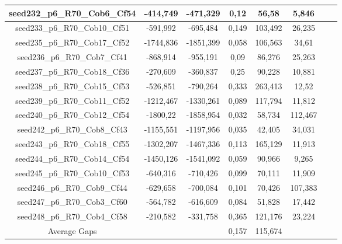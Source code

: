 \documentclass[a4paper]{article}
\begin{document}
\begin{center}
\begin{longtable}{cccccccc}
\hline
seed232\_p6\_R70\_Cob6\_Cf54 & -414,749 & -471,329 & 0,12 & 56,58 & 5,846\\
\hline
seed233\_p6\_R70\_Cob10\_Cf51 & -591,992 & -695,484 & 0,149 & 103,492 & 26,235\\
\hline
seed235\_p6\_R70\_Cob17\_Cf52 & -1744,836 & -1851,399 & 0,058 & 106,563 & 34,61\\
\hline
seed236\_p6\_R70\_Cob7\_Cf41 & -868,914 & -955,191 & 0,09 & 86,276 & 25,263\\
\hline
seed237\_p6\_R70\_Cob18\_Cf36 & -270,609 & -360,837 & 0,25 & 90,228 & 10,881\\
\hline
seed238\_p6\_R70\_Cob15\_Cf53 & -526,851 & -790,264 & 0,333 & 263,413 & 12,52\\
\hline
seed239\_p6\_R70\_Cob11\_Cf52 & -1212,467 & -1330,261 & 0,089 & 117,794 & 11,812\\
\hline
seed240\_p6\_R70\_Cob12\_Cf54 & -1800,22 & -1858,954 & 0,032 & 58,734 & 112,467\\
\hline
seed242\_p6\_R70\_Cob8\_Cf43 & -1155,551 & -1197,956 & 0,035 & 42,405 & 34,031\\
\hline
seed243\_p6\_R70\_Cob18\_Cf55 & -1302,207 & -1467,336 & 0,113 & 165,129 & 11,913\\
\hline
seed244\_p6\_R70\_Cob14\_Cf54 & -1450,126 & -1541,092 & 0,059 & 90,966 & 9,265\\
\hline
seed245\_p6\_R70\_Cob10\_Cf53 & -640,316 & -710,426 & 0,099 & 70,111 & 11,909\\
\hline
seed246\_p6\_R70\_Cob9\_Cf44 & -629,658 & -700,084 & 0,101 & 70,426 & 107,383\\
\hline
seed247\_p6\_R70\_Cob3\_Cf60 & -564,782 & -616,609 & 0,084 & 51,828 & 17,442\\
\hline
seed248\_p6\_R70\_Cob4\_Cf58 & -210,582 & -331,758 & 0,365 & 121,176 & 23,224\\
\hline
\hline
Average Gaps & & & 0,157 & 115,674 &  \\
\hline
\hline
\end{longtable}
\end{center}
\end{document}
